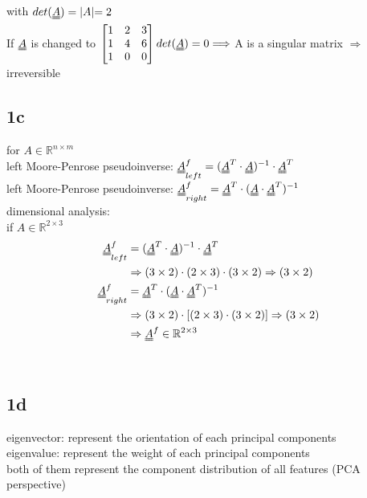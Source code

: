 \documentclass{article}
\begin{document}
with $det(\uuline{A})=\lvert A \lvert =2$
\\[15pt]
If  $\uuline{A}$ is changed to
$
\begin{bmatrix} 
1&2&3\\
1&4&6\\
1&0&0
\end{bmatrix}
\\[15pt]
det(\uuline{A})=0
\Longrightarrow
$
A is a singular matrix
$\Longrightarrow$ irreversible
\newpage
\subsection*{1c}
for $A\in \mathbb{R}^{n\times m} $
\\[15pt]
left Moore-Penrose pseudoinverse:
$
\uuline{A}^f_{left} = (\uuline{A}^T\cdot \uuline{A})^{-1} \cdot \uuline{A}^T
$\\[15pt]
left Moore-Penrose pseudoinverse:
$
\uuline{A}^f_{right} = \uuline{A}^T \cdot (\uuline{A}\cdot \uuline{A}^T)^{-1} 
$\\[15pt]
dimensional analysis:\\[15pt]
if  
$ A\in \mathbb{R}^{2\times 3}$ 
\\
\begin{equation}\notag
\begin{aligned}
\uuline{A}^f_{left} &= (\uuline{A}^T\cdot \uuline{A})^{-1} \cdot \uuline{A}^T
\\
&\Rightarrow (3\times 2)\cdot (2\times 3)\cdot (3\times 2) \Rightarrow (3\times 2)
\\
\uuline{A}^f_{right} &= \uuline{A}^T \cdot (\uuline{A}\cdot \uuline{A}^T)^{-1}
\\
&\Rightarrow (3\times 2)\cdot [(2\times 3)\cdot (3\times 2)] \Rightarrow (3\times 2)
\\
&\Rightarrow \uuline{A}^f \in \mathbb{R}^{2\times 3}
\end{aligned}
\end{equation}
\\[30pt]
\subsection*{1d}
eigenvector: represent the orientation of each principal components\\[15pt]
eigenvalue:  represent the weight of each principal components\\[15pt]
both of them represent the component distribution of all features (PCA perspective)
\newpage
\end{document}
